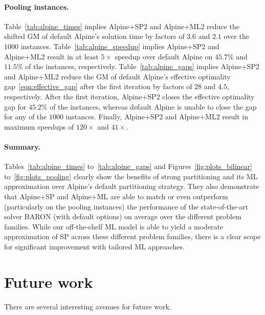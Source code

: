 \documentclass{article}
\begin{document}
\paragraph{Pooling instances.}
Table~\ref{tab:alpine_times} implies Alpine+SP2 and Alpine+ML2 reduce the shifted GM of default Alpine's solution time by factors of $3.6$ and $2.1$ over the $1000$ instances.
Table~\ref{tab:alpine_speedup} implies Alpine+SP2 and Alpine+ML2 result in at least $5\times$ speedup over default Alpine on $45.7\%$ and $11.5\%$ of the instances, respectively.
Table~\ref{tab:alpine_gaps} implies Alpine+SP2 and Alpine+ML2 reduce the GM of default Alpine's effective optimality gap~\eqref{eqn:effective_gap} after the first iteration by factors of $28$ and $4.5$, respectively.
After the first iteration, Alpine+SP2 closes the effective optimality gap for $45.2\%$ of the instances, whereas default Alpine is unable to close the gap for any of the $1000$ instances.
Finally, Alpine+SP2 and Alpine+ML2 result in maximum speedups of $120\times$ and $41\times$.



\paragraph{Summary.} Tables~\ref{tab:alpine_times} to~\ref{tab:alpine_gaps} and Figures~\ref{fig:plots_bilinear} to~\ref{fig:plots_pooling} clearly show the benefits of strong partitioning and its ML approximation over Alpine's default partitioning strategy.
They also demonstrate that Alpine+SP and Alpine+ML are able to match or even outperform (particularly on the pooling instances) the performance of the state-of-the-art solver BARON (with default options) on average over the different problem families.
While our off-the-shelf ML model is able to yield a moderate approximation of SP across these different problem families, there is a clear scope for significant improvement with tailored ML approaches.









\section{Future work}
\label{sec:conclusion}



There are several interesting avenues for future work.
\end{document}
